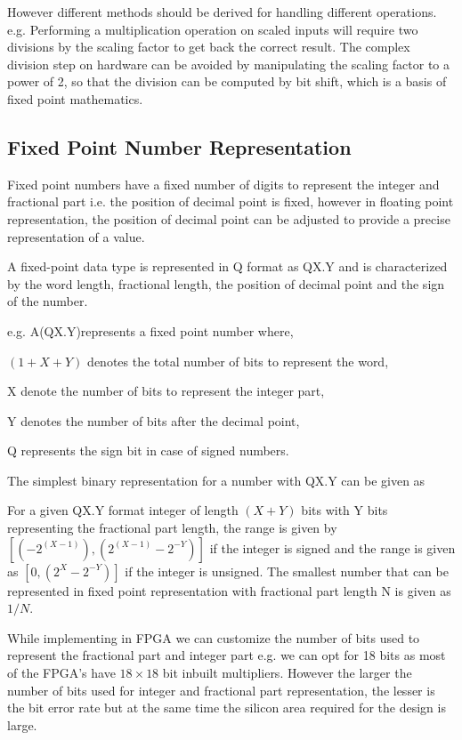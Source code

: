 \vspace{0.25cm}
\noindent However different methods should be derived for handling different operations. e.g. Performing a multiplication operation on scaled inputs will require two divisions by the scaling factor to get back the correct result. The complex division step on hardware can be avoided by manipulating the scaling factor to a power of 2, so that the division can be computed by bit shift, which is a basis of fixed point mathematics.

\subsection{Fixed Point Number Representation}
Fixed point numbers have a fixed number of digits to represent the integer and fractional part i.e. the position of decimal point is fixed, however in floating point representation, the position of decimal point can be adjusted to provide a precise representation of a value.

A fixed-point data type is represented in Q format as QX.Y and is  characterized by the word length, fractional length, the position of decimal point and the sign of the number.

\vspace{0.25cm}
\noindent e.g. A(QX.Y)represents a fixed point number where,

\noindent$(1+X+Y)$ denotes the total number of bits to represent the word,

\noindent X denote the number of bits to represent the integer part,

\noindent Y denotes the number of bits after the decimal point,

\noindent Q represents the sign bit in case of signed numbers.

\vspace{0.25cm}
\noindent The simplest binary representation for a number with QX.Y can be given as


For a given QX.Y format integer of length $(X+Y)$ bits with Y bits representing the fractional part length, the range is given by 
$[(-2^{(X-1)}),(2^{(X-1)}-2^{-Y})]$ if the integer is signed and the range is given as $[0,(2^{X}-2^{-Y})]$ if the integer is unsigned. The smallest number that can be represented in fixed point representation with fractional part length N is given as $1/N$.

\vspace{0.25cm}
While implementing in FPGA we can customize the number of bits used to represent the fractional part and integer part e.g. we can opt for 18 bits as most of the FPGA's have $18\times 18$ bit inbuilt multipliers. However the larger the number of bits used for integer and fractional part representation, the lesser is the bit error rate but at the same time the silicon area required for the design is large.

